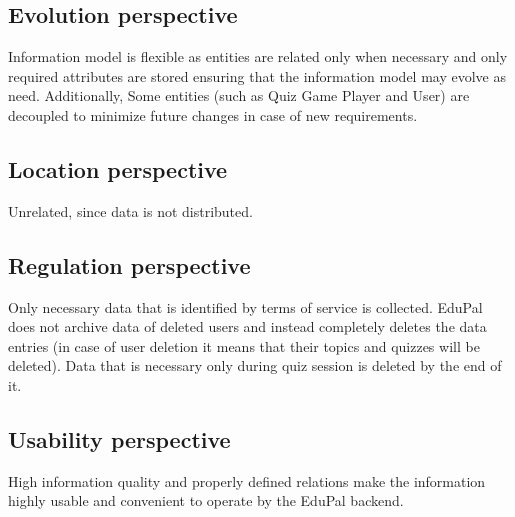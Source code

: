\subsection{Evolution perspective}

Information model is flexible as entities are related only when necessary and only required attributes are stored ensuring that the information model may evolve as need. Additionally, Some entities (such as Quiz Game Player and User) are decoupled to minimize future changes in case of new requirements.

\subsection{Location perspective}

Unrelated, since data is not distributed.

\subsection{Regulation perspective}

Only necessary data that is identified by terms of service is collected. EduPal does not archive data of deleted users and instead completely deletes the data entries (in case of user deletion it means that their topics and quizzes will be deleted). Data that is necessary only during quiz session is deleted by the end of it.

\subsection{Usability perspective}

High information quality and properly defined relations make the information highly usable and convenient to operate by the EduPal backend.
